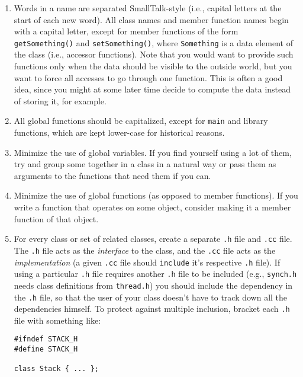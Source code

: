 \begin{enumerate}

\item Words in a name are separated SmallTalk-style (i.e., capital
letters at the start of each new word).  All class names and member
function names begin with a capital letter, except for member
functions of the form {\tt getSomething()} and {\tt setSomething()},
where {\tt Something} is a data element of the class (i.e., accessor
functions).  Note that you would want to provide such functions only
when the data should be visible to the outside world, but you want to
force all accesses to go through one function.  This is often a good
idea, since you might at some later time decide to compute the data
instead of storing it, for example.

\item All global functions should be capitalized,
except for {\tt main} and library
functions, which are kept lower-case for historical reasons.

\item Minimize the use of global variables.  If you find yourself
using a lot of them, try and group some together in a class in a
natural way or pass them as arguments to the functions that need them
if you can.

\item Minimize the use of global functions (as opposed to member
functions).  If you write a function that operates on some object,
consider making it a member function of that object.

\item For every class or set of related classes, create a separate
{\tt .h} file and {\tt .cc} file. The {\tt .h} file acts as the {\it
interface} to the class, and the {\tt .cc} file acts as the
{\it implementation} (a given {\tt .cc} file should {\tt include} it's
respective {\tt .h} file).  If using a particular {\tt .h} file requires
another {\tt .h} file to be included (e.g., {\tt synch.h} needs
class definitions from {\tt thread.h}) you should include the dependency
in the {\tt .h} file, so that the user of your class doesn't have to
track down all the dependencies himself.
To protect against multiple inclusion, bracket each {\tt .h}
file with something like:
\begin{verbatim}
#ifndef STACK_H
#define STACK_H

class Stack { ... };


\end{verbatim}
\end{enumerate}
